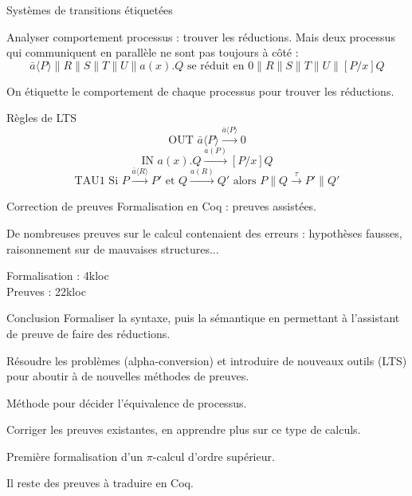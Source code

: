 \documentclass{beamer}
\begin{document}
\begin{frame}{Systèmes de transitions étiquetées}

Analyser comportement processus : trouver les réductions.
Mais deux processus qui communiquent en parallèle ne sont pas toujours à côté :
$$\bar{a}\langle P\rangle\|R\|S\|T\|U\|a(x).Q \text{ se réduit en } 0\|R\|S\|T\|U\|[P/x]Q$$

On étiquette le comportement de chaque processus pour trouver les réductions.

\begin{block}{Règles de LTS}
$$\text{OUT } \bar{a}\langle P\rangle \overset{\bar{a}\langle P\rangle}{\longrightarrow} 0$$
$$\text{IN } a(x).Q \overset{a(P)}{\longrightarrow} [P/x]Q$$
$$\text{TAU1 Si } P\overset{\bar{a}\langle R\rangle}{\longrightarrow} P' \text{ et } Q\overset{a(R)}{\longrightarrow} Q' \text{ alors } P\|Q \overset{\tau}{\longrightarrow} P'\|Q'$$
\end{block}

\end{frame}

\begin{frame}{Correction de preuves}
Formalisation en Coq : preuves assistées.

De nombreuses preuves sur le calcul contenaient des erreurs : hypothèses fausses, raisonnement sur de mauvaises structures...

Formalisation : 4kloc\\
Preuves : 22kloc
\end{frame}

\begin{frame}{Conclusion}
Formaliser la syntaxe, puis la sémantique en permettant à l'assistant de preuve de faire des réductions.

Résoudre les problèmes (alpha-conversion) et introduire de nouveaux outils (LTS) pour aboutir à de nouvelles méthodes de preuves.

Méthode pour décider l'équivalence de processus.

Corriger les preuves existantes, en apprendre plus sur ce type de calculs.

Première formalisation d'un $\pi$-calcul d'ordre supérieur.

Il reste des preuves à traduire en Coq.
\end{frame}
\end{document}
